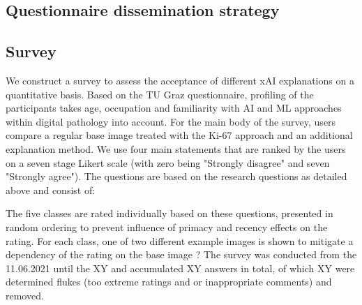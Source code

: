 \subsection{Questionnaire dissemination strategy}

\subsection{Survey}

We construct a survey to assess the acceptance of different xAI explanations on a quantitative basis. Based on the TU Graz questionnaire, profiling of the participants takes age, occupation and familiarity with AI and ML approaches within digital pathology into account. For the main body of the survey, users compare a regular base image treated with the Ki-67 approach and an additional explanation method. We use four main statements that are ranked by the users on a seven stage Likert scale (with zero being "Strongly disagree" and seven "Strongly agree"). The questions are based on the research questions as detailed above and consist of:


The five classes are rated individually based on these questions, presented in random ordering to prevent influence of primacy and recency effects on the rating. For each class, one of two different example images is shown to mitigate a dependency of the rating on the base image ?
The survey was conducted from the 11.06.2021 until the XY and accumulated XY answers in total, of which XY were determined flukes (too extreme ratings and or inappropriate comments) and removed.




